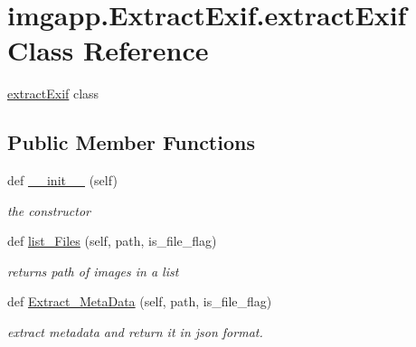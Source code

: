 \hypertarget{classimgapp_1_1ExtractExif_1_1extractExif}{}\section{imgapp.\+Extract\+Exif.\+extract\+Exif Class Reference}
\label{classimgapp_1_1ExtractExif_1_1extractExif}


\hyperlink{classimgapp_1_1ExtractExif_1_1extractExif}{extract\+Exif} class  


\subsection*{Public Member Functions}
\begin{DoxyCompactItemize}
\item 
def \hyperlink{classimgapp_1_1ExtractExif_1_1extractExif_a8ae006214e9d8a2f8f65f835f2d98808}{\+\_\+\+\_\+init\+\_\+\+\_\+} (self)
\begin{DoxyCompactList}\small\item\em the constructor \end{DoxyCompactList}\item 
def \hyperlink{classimgapp_1_1ExtractExif_1_1extractExif_a3e424b58f924335e09cc6ed35df975ec}{list\+\_\+\+Files} (self, path, is\+\_\+file\+\_\+flag)
\begin{DoxyCompactList}\small\item\em returns path of images in a list \end{DoxyCompactList}\item 
def \hyperlink{classimgapp_1_1ExtractExif_1_1extractExif_a44b9e19a283359e549248d46b9d6bbae}{Extract\+\_\+\+Meta\+Data} (self, path, is\+\_\+file\+\_\+flag)
\begin{DoxyCompactList}\small\item\em extract metadata and return it in json format. \end{DoxyCompactList}\end{DoxyCompactItemize}

